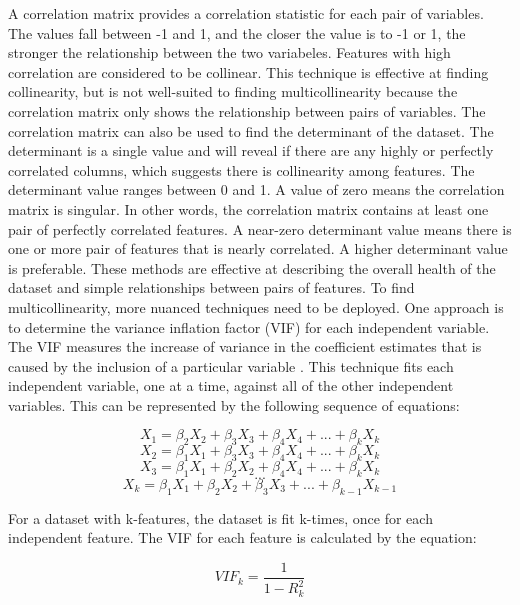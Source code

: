 \documentclass[sigconf]{acmart}
\begin{document}
A correlation matrix provides a correlation statistic for each pair of variables. The values fall between -1 and 1, and the closer the value is to -1 or 1, the stronger the relationship between the two variabeles. Features with high correlation are considered to be collinear. This technique is effective at finding collinearity, but is not well-suited to finding multicollinearity because the correlation matrix only shows the relationship between pairs of variables.  
The correlation matrix can also be used to find the determinant of the dataset. The determinant is a single value and  will reveal if there are any highly or perfectly correlated columns, which suggests there is collinearity among features. The determinant value ranges between 0 and 1. A value of zero means the correlation matrix is singular. In other words, the correlation matrix contains at least one pair of perfectly correlated features. A near-zero determinant value means there is one or more pair of features that is nearly correlated. A higher determinant value is preferable.
These methods are effective at describing the overall health of the dataset and simple relationships between pairs of features. To find multicollinearity, more nuanced techniques need to be deployed. One approach is to determine the variance inflation factor (VIF) for each independent variable. The VIF measures the increase of variance in the coefficient estimates that is caused by the inclusion of a particular variable \cite{cite15}. This technique fits each independent variable, one at a time, against all of the other independent variables. This can be represented by the following sequence of equations:

\[X_1 = \beta_2X_2 + \beta_3X_3 + \beta_4X_4 + ... + \beta_kX_k \]
\[X_2 = \beta_1X_1 + \beta_3X_3 + \beta_4X_4 + ... + \beta_kX_k \]
\[X_3 = \beta_1X_1 + \beta_2X_2 + \beta_4X_4 + ... + \beta_kX_k \]
\[...\]
\[X_k = \beta_1X_1 + \beta_2X_2 + \beta_3X_3 + ... + \beta_{k-1}X_{k-1} \]

For a dataset with k-features, the dataset is fit k-times, once for each independent feature. The VIF for each feature is calculated by the equation:

\[ VIF_k =\frac{1}{1 - R^2_k}\]
\end{document}
